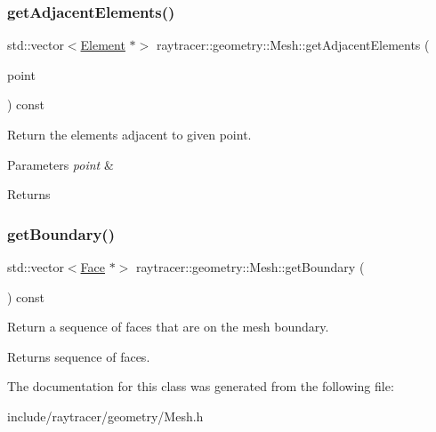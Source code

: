 \subsubsection{\texorpdfstring{get\+Adjacent\+Elements()}{getAdjacentElements()}}
{\footnotesize\ttfamily std\+::vector$<$\hyperlink{classraytracer_1_1geometry_1_1Element}{Element} $\ast$$>$ raytracer\+::geometry\+::\+Mesh\+::get\+Adjacent\+Elements (\begin{DoxyParamCaption}\item[{const \hyperlink{classraytracer_1_1geometry_1_1Point}{Point} $\ast$}]{point }\end{DoxyParamCaption}) const}



Return the elements adjacent to given point. 


\begin{DoxyParams}{Parameters}
{\em point} & \\
\hline
\end{DoxyParams}
\begin{DoxyReturn}{Returns}

\end{DoxyReturn}
\mbox{\label{classraytracer_1_1geometry_1_1Mesh_a3f7cc92317844c16e350469f7a2222af}} 
\subsubsection{\texorpdfstring{get\+Boundary()}{getBoundary()}}
{\footnotesize\ttfamily std\+::vector$<$\hyperlink{classraytracer_1_1geometry_1_1Face}{Face} $\ast$$>$ raytracer\+::geometry\+::\+Mesh\+::get\+Boundary (\begin{DoxyParamCaption}{ }\end{DoxyParamCaption}) const}



Return a sequence of faces that are on the mesh boundary. 

\begin{DoxyReturn}{Returns}
sequence of faces. 
\end{DoxyReturn}


The documentation for this class was generated from the following file\+:\begin{DoxyCompactItemize}
\item 
include/raytracer/geometry/Mesh.\+h\end{DoxyCompactItemize}
